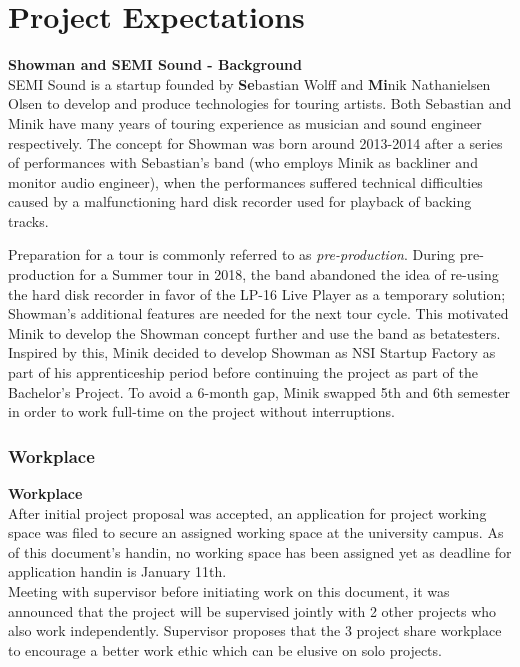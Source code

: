 \chapter{Project Expectations}
\textbf{Showman and SEMI Sound - Background} \\
SEMI Sound is a startup founded by \textbf{Se}bastian Wolff and \textbf{Mi}nik Nathanielsen Olsen to develop and produce technologies for touring artists. Both Sebastian and Minik have many years of touring experience  as musician and sound engineer respectively. The concept for Showman was born around 2013-2014 after a series of performances with Sebastian's band (who employs Minik as backliner and monitor audio engineer), when the performances suffered technical difficulties caused by a malfunctioning hard disk recorder used for playback of backing tracks. \newline

Preparation for a tour is commonly referred to as \textit{pre-production}. During pre-production for a Summer tour in 2018, the band abandoned the idea of re-using the hard disk recorder in favor of the LP-16 Live Player as a temporary solution; Showman's additional features are needed for the next tour cycle. This motivated Minik to develop the Showman concept further and use the band as betatesters. Inspired by this, Minik decided to develop Showman as NSI Startup Factory as part of his apprenticeship period before continuing the project as part of the Bachelor's Project. To avoid a 6-month gap, Minik swapped 5th and 6th semester in order to work full-time on the project without interruptions. \newline

\subsection{Workplace}
\textbf{Workplace} \\
After initial project proposal was accepted, an application for project working space was filed to secure an assigned working space at the university campus. As of this document's handin, no working space has been assigned yet as deadline for application handin is January 11th. \\

Meeting with supervisor before initiating work on this document, it was announced that the project will be supervised jointly with 2 other projects who also work independently. Supervisor proposes that the 3 project share workplace to encourage a better work ethic which can be elusive on solo projects. \\

